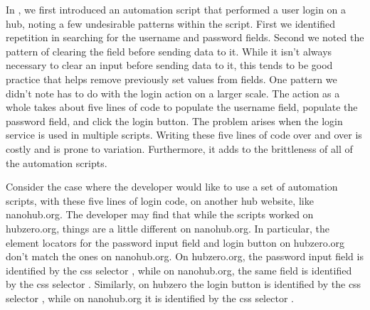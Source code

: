 In , we first introduced an
automation script that performed a user login on a hub, noting a few
undesirable patterns within the script. First we identified repetition in
searching for the username and password fields. Second we noted the pattern of
clearing the field before sending data to it. While it isn't always necessary
to clear an input before sending data to it, this tends to be good practice
that helps remove previously set values from fields.  One pattern we didn't
note has to do with the login action on a larger scale.  The action as a whole
takes about five lines of code to populate the username field, populate the
password field, and click the login button. The problem arises when the login
service is used in multiple scripts.  Writing these five lines of code over and
over is costly and is prone to variation. Furthermore, it adds to the
brittleness of all of the automation scripts.

Consider the case where the developer would like to use a set of automation
scripts, with these five lines of login code, on another hub website, like
nanohub.org.  The developer may find that while the scripts worked on
hubzero.org, things are a little different on nanohub.org. In particular, the
element locators for the password input field and login button on hubzero.org
don't match the ones on nanohub.org. On hubzero.org, the password input field
is identified by the css selector , while on nanohub.org,
the same field is identified by the css selector .
Similarly, on hubzero the login button is identified by the css selector
\xflocator{[name=`Submit']}, while on nanohub.org it is identified by the css
selector .

